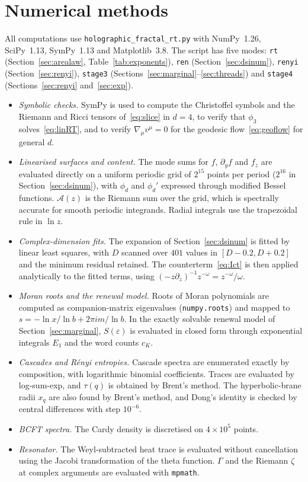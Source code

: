 \documentclass[11pt]{article}
\theoremstyle{definition}\newtheorem{definition}{Definition}[section]
\theoremstyle{remark}\newtheorem*{remark}{Remark}
\newcommand{\cA}{\mathcal{A}}
\begin{document}
\section{Numerical methods}
\label{app:numerics}
All computations use \texttt{holographic\_fractal\_rt.py} with NumPy~1.26, SciPy~1.13, SymPy~1.13 and
Matplotlib~3.8. The script has five modes: \texttt{rt} (Section~\ref{sec:arealaw}, Table~\ref{tab:exponents}),
\texttt{ren} (Section~\ref{sec:dsinum}), \texttt{renyi} (Section~\ref{sec:renyi}), \texttt{stage3}
(Sections~\ref{sec:marginal}--\ref{sec:threads}) and \texttt{stage4} (Sections~\ref{sec:renyi}
and~\ref{sec:exp}).
\begin{itemize}
\item \emph{Symbolic checks.} SymPy is used to compute the Christoffel symbols and the Riemann and Ricci
tensors of~\eqref{eq:slice} in $d=4$, to verify that $\phi_3$ solves~\eqref{eq:linRT}, and to verify
$\nabla_\mu v^\mu=0$ for the geodesic flow~\eqref{eq:geoflow} for general $d$.
\item \emph{Linearised surfaces and content.} The mode sums for $f$, $\partial_yf$ and $f_z$ are evaluated
directly on a uniform periodic grid of $2^{15}$ points per period ($2^{16}$ in Section~\ref{sec:dsinum}), with
$\phi_d$ and $\phi_d'$ expressed through modified Bessel functions. $\cA(z)$ is the Riemann sum over the grid,
which is spectrally accurate for smooth periodic integrands. Radial integrals use the trapezoidal rule in
$\ln z$.
\item \emph{Complex-dimension fits.} The expansion of Section~\ref{sec:dsinum} is fitted by linear least
squares, with $D$ scanned over $401$ values in $[D-0.2,D+0.2]$ and the minimum residual retained. The
counterterm~\eqref{eq:Ict} is then applied analytically to the fitted terms, using
$(-z\partial_z)^{-1}z^{-\omega}=z^{-\omega}/\omega$.
\item \emph{Moran roots and the renewal model.} Roots of Moran polynomials are computed as companion-matrix
eigenvalues (\texttt{numpy.roots}) and mapped to $s=-\ln x/\ln b+2\pi im/\ln b$. In the exactly solvable
renewal model of Section~\ref{sec:marginal}, $S(\varepsilon)$ is evaluated in closed form through exponential
integrals $E_1$ and the word counts $c_K$.
\item \emph{Cascades and R\'enyi entropies.} Cascade spectra are enumerated exactly by composition, with
logarithmic binomial coefficients. Traces are evaluated by log-sum-exp, and $\tau(q)$ is obtained by Brent's
method. The hyperbolic-brane radii $x_q$ are also found by Brent's method, and Dong's identity is checked by
central differences with step $10^{-6}$.
\item \emph{BCFT spectra.} The Cardy density is discretised on $4\times10^5$ points.
\item \emph{Resonator.} The Weyl-subtracted heat trace is evaluated without cancellation using the Jacobi
transformation of the theta function. $\Gamma$ and the Riemann $\zeta$ at complex arguments are evaluated
with \texttt{mpmath}.
\end{itemize}
\end{document}
